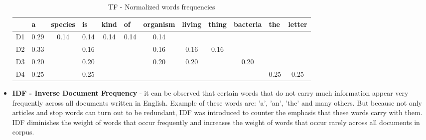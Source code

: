 \begin{itemize}
\begin{table}[H]
	\centering
	\caption{TF - Normalized words frequencies}
	\label{tf_idf_tf_norm_freq}
	\begin{tabular}{@{}lccccccccccc@{}}
		\toprule
		& \multicolumn{1}{l}{a} & \multicolumn{1}{l}{species} & \multicolumn{1}{l}{is} & \multicolumn{1}{l}{kind} & \multicolumn{1}{l}{of} & \multicolumn{1}{l}{organism} & \multicolumn{1}{l}{living} & \multicolumn{1}{l}{thing} & \multicolumn{1}{l}{bacteria} & \multicolumn{1}{l}{the} & \multicolumn{1}{l}{letter} \\ \midrule
		D1 & 0.29                  & 0.14                        & 0.14                   & 0.14                     & 0.14                   & 0.14                         &                            &                           &                              &                         &                            \\
		D2 & 0.33                  &                             & 0.16                   &                          &                        & 0.16                         & 0.16                       & 0.16                      &                              &                         &                            \\
		D3 & 0.20                  &                             & 0.20                   &                          &                        & 0.20                         & 0.20                       &                           & 0.20                         &                         &                            \\
		D4 & 0.25                  &                             & 0.25                   &                          &                        &                              &                            &                           &                              & 0.25                    & 0.25                       \\ \bottomrule
	\end{tabular}
\end{table}
	
	\item \textbf{IDF - Inverse Document Frequency} - it can be observed that certain words that do not carry much information appear very frequently across all documents written in English. Example of these words are: 'a', 'an', 'the' and many others. But because not only articles and stop words can turn out to be redundant, IDF was introduced to counter the emphasis that these words carry with them. IDF diminishes the weight of words that occur frequently and increases the weight of words that occur rarely across all documents in corpus.


\end{itemize}
